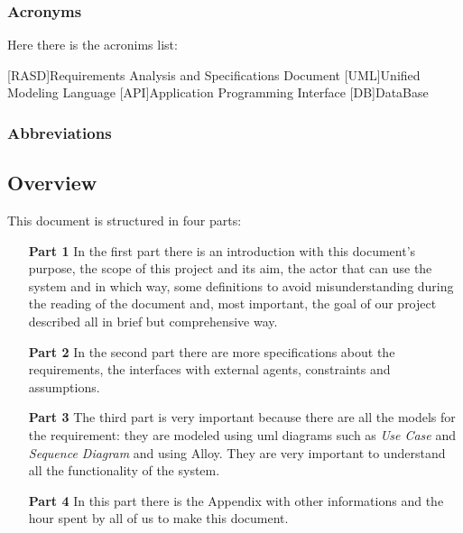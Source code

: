 \subsubsection{Acronyms} \label{acr}
Here there is the acronims list:

\begin{acronym}[RASD] %

[RASD]{Requirements Analysis and Specifications Document}
[UML]{Unified Modeling Language}
[API]{Application Programming Interface}
[DB]{DataBase}

\end{acronym}

\subsubsection{Abbreviations} \label{abbre}


\subsection{Overview} \label{subsec:overview}
This document is structured in four parts:
\begin{itemize}
\item[\textbf{Part 1}]In the first part there is an introduction with this document’s purpose, the scope of this project and its aim, the actor that can use  the system and in which way, some definitions to avoid misunderstanding during the reading of the document and, most important, the goal of our project described all in brief but comprehensive way.  
\item[\textbf{Part 2}]In the second part there are more specifications about the requirements, the interfaces with external agents, constraints and assumptions.
\item[\textbf{Part 3}]The third part is very important because there are all the models for the requirement: they are modeled using \acs{uml} diagrams such as \emph{Use Case} and \emph{Sequence Diagram} and using Alloy. They are very important to understand all the functionality of the system.  
\item[\textbf{Part 4}]In this part there is the Appendix with other informations and the hour spent by all of us to make this document.
\end{itemize}

